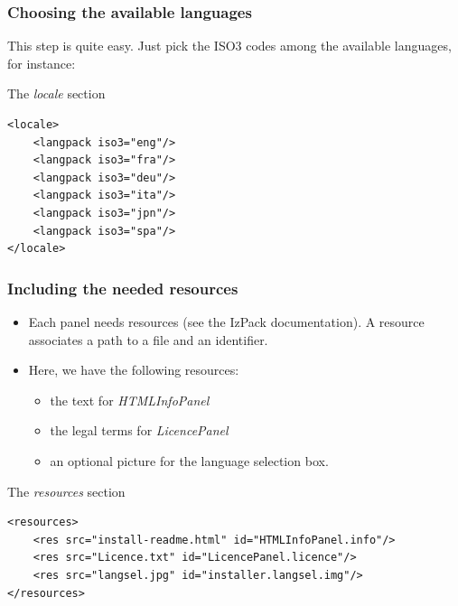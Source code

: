 \documentclass[compress,10pt]{beamer}
\begin{document}

\begin{frame}[containsverbatim]

\frametitle{Choosing the available languages}

This step is quite easy. Just pick the ISO3 codes among the available languages,
for instance:

\begin{block}{The \textsl{locale} section}
\tiny
\begin{verbatim}
<locale>
    <langpack iso3="eng"/>
    <langpack iso3="fra"/>
    <langpack iso3="deu"/>
    <langpack iso3="ita"/>
    <langpack iso3="jpn"/>
    <langpack iso3="spa"/>
</locale>
\end{verbatim}
\end{block}

\end{frame}


\begin{frame}[containsverbatim]

\frametitle{Including the needed resources}

\begin{itemize}

  \item Each panel needs resources (see the IzPack documentation). A resource
  associates a path to a file and an identifier.

  \item Here, we have the following resources:
    \begin{itemize}
      \item the text for \textsl{HTMLInfoPanel}
      \item the legal terms for \textsl{LicencePanel}
      \item an optional picture for the language selection box.
    \end{itemize}

\end{itemize}

\begin{block}{The \textsl{resources} section}
\tiny
\begin{verbatim}
<resources>
    <res src="install-readme.html" id="HTMLInfoPanel.info"/>
    <res src="Licence.txt" id="LicencePanel.licence"/>
    <res src="langsel.jpg" id="installer.langsel.img"/>
</resources>
\end{verbatim}
\end{block}

\end{frame}
\end{document}
